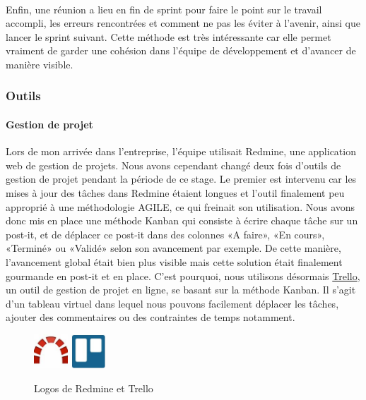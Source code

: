 \paragraph{}Enfin, une réunion a lieu en fin de sprint pour faire le point sur le travail accompli, les erreurs rencontrées et comment ne pas les éviter à l'avenir, ainsi que lancer le sprint suivant. Cette méthode est très intéressante car elle permet vraiment de garder une cohésion dans l’équipe de développement et d’avancer de manière visible. 

	\subsubsection{Outils}
		\paragraph{Gestion de projet\\}
Lors de mon arrivée dans l'entreprise, l’équipe utilisait Redmine, une application web de gestion de projets. Nous avons cependant changé deux fois d'outils de gestion de projet pendant la période de ce stage. Le premier est intervenu car les mises à jour des tâches dans Redmine étaient longues et l'outil finalement peu approprié à une méthodologie AGILE, ce qui freinait son utilisation. Nous avons donc mis en place une méthode Kanban qui consiste à écrire chaque tâche sur un post-it, et de déplacer ce post-it dans des colonnes «A faire», «En cours», «Terminé» ou «Validé» selon son avancement par exemple. De cette manière, l’avancement global était bien plus visible mais cette solution était finalement gourmande en post-it et en place. C'est pourquoi, nous utilisons désormais \href{www.trello.com}{Trello}, un outil de gestion de projet en ligne, se basant sur la méthode Kanban. Il s’agit d’un tableau virtuel dans lequel nous pouvons facilement déplacer les tâches, ajouter des commentaires ou des contraintes de temps notamment.

	\begin{figure}[!h]
		\centering
		\includegraphics[height=48px]{images/redmine.jpg}
		\includegraphics[height=48px]{images/trello.jpg}
		\caption{Logos de Redmine et Trello}
		\label{logos_redmine_trello}
	\end{figure}

